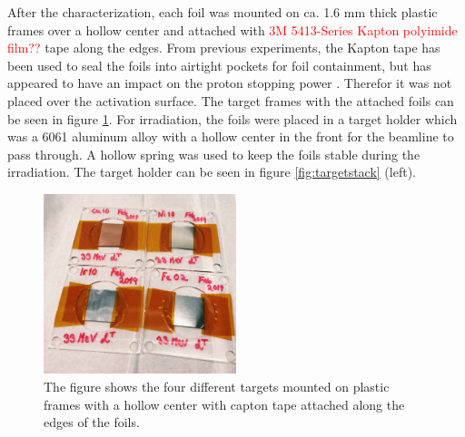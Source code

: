 \noindent 
After the characterization, each foil was mounted on ca. 1.6 mm thick plastic frames over a hollow center and attached with \textcolor{red}{3M 5413-Series Kapton polyimide film??} tape along the edges. From previous experiments, the Kapton tape has been used to seal the foils into airtight pockets for foil containment, but has appeared to have an impact on the proton stopping power \cite{Voyles2019}. Therefor it was not placed over the activation surface. The target frames with the attached foils can be seen in figure \ref{fig:targets_on_frame}. For irradiation, the foils were placed in a target holder which was a 6061 aluminum alloy with a hollow center in the front for the beamline to pass through. A hollow spring was used to keep the foils stable during the irradiation. The target holder can be seen in figure \ref{fig:targetstack} (left).    

\begin{figure}
    \centering
    \includegraphics[width=0.5\textwidth]{Experiment/targets_on_frame.JPG}
    \caption{The figure shows the four different targets mounted on plastic frames with a hollow center with capton tape attached along the edges of the foils.}
    \label{fig:targets_on_frame}
\end{figure}


